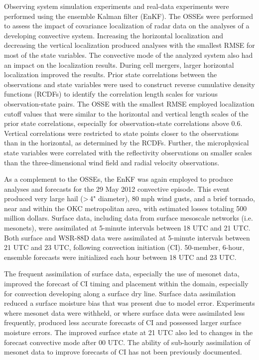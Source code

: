 \begin{preface}
\tableofcontents
\listoftables
\listoffigures
{}
Observing system simulation experiments and real-data experiments were performed using the ensemble Kalman filter (EnKF). The OSSEs were performed to assess the impact of covariance localization of radar data on the analyses of a developing convective system. Increasing the horizontal localization and decreasing the vertical localization produced analyses with the smallest RMSE for most of the state variables. The convective mode of the analyzed system also had an impact on the localization results. During cell mergers, larger horizontal localization improved the results. Prior state correlations between the observations and state variables were used to construct reverse cumulative density functions (RCDFs) to identify the correlation length scales for various observation-state pairs. The OSSE with the smallest RMSE employed localization cutoff values that were similar to the horizontal and vertical length scales of the prior state correlations, especially for observation-state correlations above 0.6. Vertical correlations were restricted to state points closer to the observations than in the horizontal, as determined by the RCDFs. Further, the microphysical state variables were correlated with the reflectivity observations on smaller scales than the three-dimensional wind field and radial velocity observations.

As a complement to the OSSEs, the EnKF was again employed to produce analyses and forecasts for the 29 May 2012 convective episode. This event produced very large hail (\textgreater\,4" diameter), 80 mph wind gusts, and a brief tornado, near and within the OKC metropolitan area, with estimated losses totaling 500 million dollars. Surface data, including data from surface mesoscale networks (i.e. mesonets), were assimilated at 5-minute intervals between 18 UTC and 21 UTC. Both surface and WSR-88D data were assimilated at 5-minute intervals between 21 UTC and 23 UTC, following convection initiation (CI). 50-member, 6-hour, ensemble forecasts were initialized each hour between 18 UTC and 23 UTC.

The frequent assimilation of surface data, especially the use of mesonet data, improved the forecast of CI timing and placement within the domain, especially for convection developing along a surface dry line. Surface data assimilation reduced a surface moisture bias that was present due to model error. Experiments where mesonet data were withheld, or where surface data were assimilated less frequently, produced less accurate forecasts of CI and possessed larger surface moisture errors. The improved surface state at 21 UTC also led to changes in the forecast convective mode after 00 UTC. The ability of sub-hourly assimilation of mesonet data to improve forecasts of CI has not been previously documented.


\end{preface}
